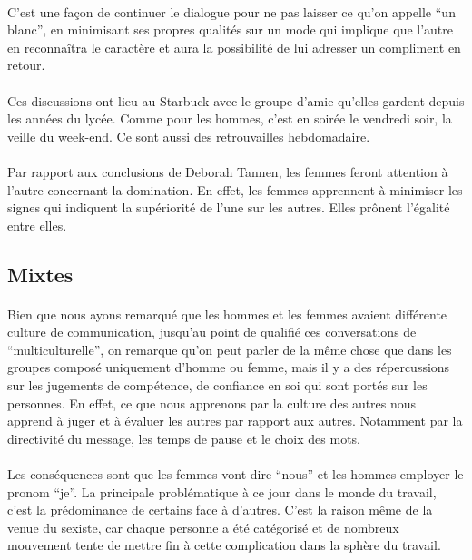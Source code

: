 \paragraph{} C'est une façon de continuer le dialogue pour ne pas laisser ce
qu'on appelle ``un blanc'', en minimisant ses propres qualités sur un mode qui
implique que l'autre en reconnaîtra le caractère et aura la possibilité de lui
adresser un compliment en retour.

\paragraph{} Ces discussions ont lieu au Starbuck avec le groupe d'amie
qu'elles gardent depuis les années du lycée.  Comme pour les hommes, c'est en
soirée le vendredi soir, la veille du week-end. Ce sont aussi des retrouvailles
hebdomadaire.

\paragraph{} Par rapport aux conclusions de Deborah Tannen, les femmes feront
attention à l'autre concernant la domination. En effet, les femmes apprennent à
minimiser les signes qui indiquent la supériorité de l'une sur les autres.
Elles prônent l'égalité entre elles.

\subsection{Mixtes}

\paragraph{} Bien que nous ayons remarqué que les hommes et les femmes avaient
différente culture de communication, jusqu'au point de qualifié ces
conversations de ``multiculturelle'', on remarque qu'on peut parler de la même
chose que dans les groupes composé uniquement d'homme ou femme, mais il y a des
répercussions sur les jugements de compétence, de confiance en soi qui sont
portés sur les personnes. En effet, ce que nous apprenons par la culture des
autres nous apprend à juger et à évaluer les autres par rapport aux autres.
Notamment par la directivité du message, les temps de pause et le choix des
mots.

\paragraph{} Les conséquences sont que les femmes vont dire ``nous'' et les
hommes employer le pronom ``je''. La principale problématique à ce jour dans
le monde du travail, c'est la prédominance de certains face à d'autres. C'est
la raison même de la venue du sexiste, car chaque personne a été catégorisé et
de nombreux mouvement tente de mettre fin à cette complication dans la sphère
du travail.

